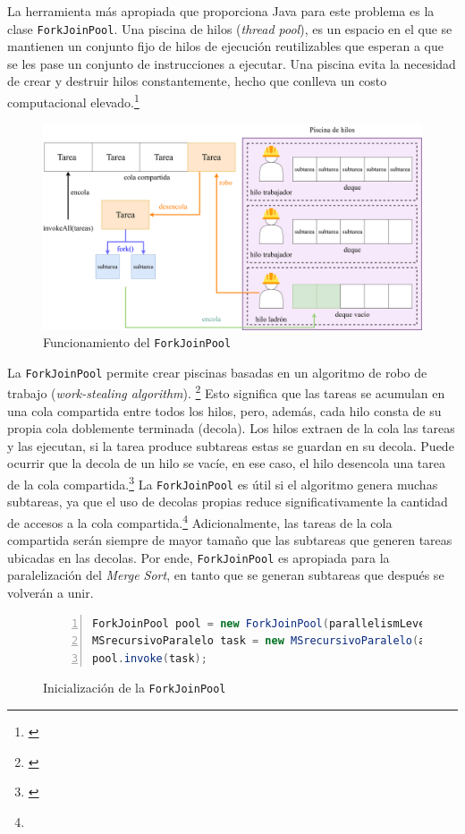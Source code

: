 \documentclass[titlepage]{article}
\begin{document}
La herramienta más apropiada que proporciona Java para este problema es la clase \lstinline{ForkJoinPool}.\footnotemark {} Una piscina de hilos (\textit{thread pool}), es un espacio en el que se mantienen un conjunto fijo de hilos de ejecución reutilizables que esperan a que se les pase un conjunto de instrucciones a ejecutar. Una piscina evita la necesidad de crear y destruir hilos constantemente, hecho que conlleva un costo computacional elevado.\footnote{\cite{engle_2022}}

\begin{figure}[h]
	\centering
	\includegraphics[width=0.75\linewidth]{Diagrames/forkJoinPool.png}
	\caption{Funcionamiento del \lstinline{ForkJoinPool}}
	\label{fig:forkJoinPool}
\end{figure}

La \lstinline{ForkJoinPool} permite crear piscinas basadas en un algoritmo de robo de trabajo (\textit{work-stealing algorithm}). \footnote{\cite{Ramgir2017-mv}} Esto significa que las tareas se acumulan en una cola compartida entre todos los hilos, pero, además, cada hilo consta de su propia cola doblemente terminada (decola). Los hilos extraen de la cola las tareas y las ejecutan, si la tarea produce subtareas estas se guardan en su decola. Puede ocurrir que la decola de un hilo se vacíe, en ese caso, el hilo desencola una tarea de la cola compartida.\footnote{\cite{kumar_2024}} La \lstinline{ForkJoinPool} es útil si el algoritmo genera muchas subtareas, ya que el uso de decolas propias reduce significativamente la cantidad de accesos a la cola compartida.\footnote[17]{} Adicionalmente, las tareas de la cola compartida serán siempre de mayor tamaño que las subtareas que generen tareas ubicadas en las decolas. Por ende, \lstinline{ForkJoinPool} es apropiada para la paralelización del \textit{Merge Sort}, en tanto que se generan subtareas que después se volverán a unir.

\begin{figure}[h]
	\begin{lstlisting}[language=java, frame=single, numbers=left]
ForkJoinPool pool = new ForkJoinPool(parallelismLevel);
MSrecursivoParalelo task = new MSrecursivoParalelo(arr, aux, left, right);
pool.invoke(task);
	\end{lstlisting}
	\caption{Inicialización de la \lstinline{ForkJoinPool}}
	\label{fig:creacionForkJoinPool}
\end{figure}
\end{document}
